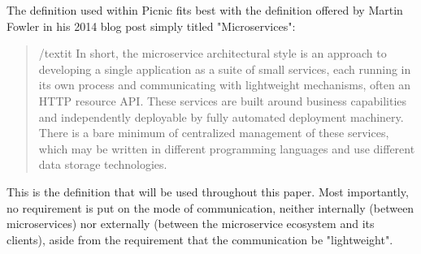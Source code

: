 The definition used within Picnic fits best with the definition offered by Martin Fowler in his 2014 blog post simply titled "Microservices":
\begin{quote}
/textit{
    In short, the microservice architectural style is an approach to developing a single application as a suite of small services, each running in its own process and communicating with lightweight mechanisms, often an HTTP resource API. These services are built around business capabilities and independently deployable by fully automated deployment machinery. There is a bare minimum of centralized management of these services, which may be written in different programming languages and use different data storage technologies. \cite{fowler2014microservices}}
\end{quote}
This is the definition that will be used throughout this paper. Most importantly, no requirement is put on the mode of communication, neither internally (between microservices) nor externally (between the microservice ecosystem and its clients), aside from the requirement that the communication be "lightweight". 


